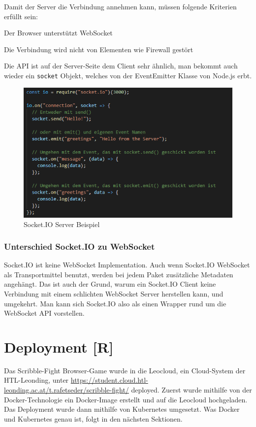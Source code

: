 Damit der Server die Verbindung annehmen kann, müssen folgende Kriterien erfüllt sein:
\begin{compactitem}
    \item Der Browser unterstützt WebSocket
    \item Die Verbindung wird nicht von Elementen wie Firewall gestört
\end{compactitem}
Die API ist auf der Server-Seite dem Client sehr ähnlich, man bekommt auch wieder ein \texttt{socket} Objekt, welches von der EventEmitter Klasse von Node.js erbt.

\begin{figure}[H]
    \centering
    \includegraphics[scale=1]{pics/SocketIO_server.PNG}
    \caption{Socket.IO Server Beispiel}
\end{figure}


\subsubsection{Unterschied Socket.IO zu WebSocket}
Socket.IO ist keine WebSocket Implementation. Auch wenn Socket.IO WebSocket als Transportmittel benutzt, werden bei jedem Paket zusätzliche Metadaten angehängt. Das ist auch der Grund, warum 
ein Socket.IO Client keine Verbindung mit einem schlichten WebSocket Server herstellen kann, und umgekehrt. 
Man kann sich Socket.IO also als einen Wrapper rund um die WebSocket API vorstellen.

\section{Deployment [R]}
Das Scribble-Fight Browser-Game wurde in die Leocloud, ein Cloud-System der HTL-Leonding, unter \url{https://student.cloud.htl-leonding.ac.at/t.rafetseder/scribble-fight/} deployed.
Zuerst wurde mithilfe von der Docker-Technologie ein Docker-Image erstellt und auf die Leocloud hochgeladen. Das Deployment wurde dann mithilfe von Kubernetes umgesetzt. 
Was Docker und Kubernetes genau ist, folgt in den nächsten Sektionen.
